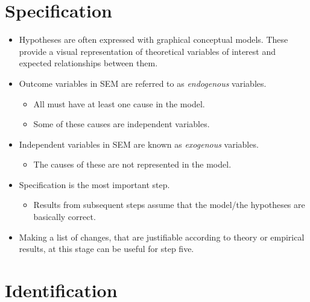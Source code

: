 \documentclass[]{book}
\providecommand{\tightlist}{%
  \setlength{\itemsep}{0pt}\setlength{\parskip}{0pt}}
\begin{document}
\hypertarget{specification}{%
\section{Specification}\label{specification}}

\begin{itemize}
\tightlist
\item
  Hypotheses are often expressed with graphical conceptual models. These provide a visual representation of theoretical variables of interest and expected relationships between them.
\item
  Outcome variables in SEM are referred to as \emph{endogenous} variables.

  \begin{itemize}
  \tightlist
  \item
    All must have at least one cause in the model.
  \item
    Some of these causes are independent variables.
  \end{itemize}
\item
  Independent variables in SEM are known as \emph{exogenous} variables.

  \begin{itemize}
  \tightlist
  \item
    The causes of these are not represented in the model.
  \end{itemize}
\item
  Specification is the most important step.

  \begin{itemize}
  \tightlist
  \item
    Results from subsequent steps assume that the model/the hypotheses are basically correct.
  \end{itemize}
\item
  Making a list of changes, that are justifiable according to theory or empirical results, at this stage can be useful for step five.
\end{itemize}

\hypertarget{identification}{%
\section{Identification}\label{identification}}
\end{document}
